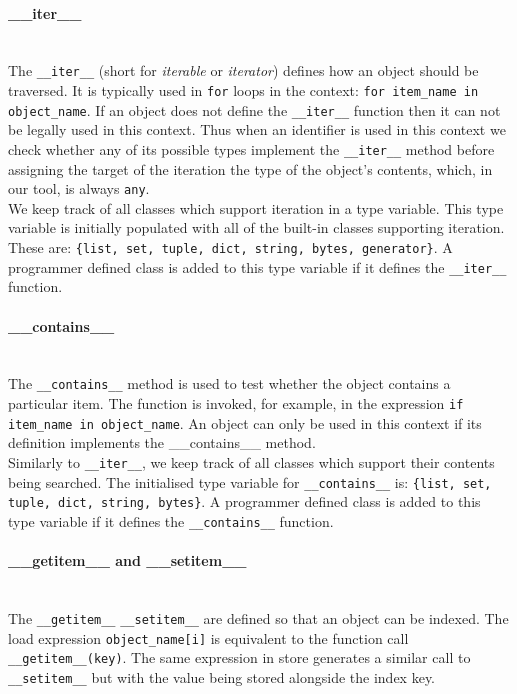 \documentclass[12pt, titlepage]{article}
\begin{document}
\paragraph*{\_\_iter\_\_}\mbox{} \\
The \texttt{\_\_iter\_\_} (short for \textit{iterable} or \textit{iterator}) defines how an object should be traversed. It is typically used in \texttt{for} loops in the context: \texttt{for item\_name in object\_name}. If an object does not define the \texttt{\_\_iter\_\_} function then it can not be legally used in this context. Thus when an identifier is used in this context we check whether any of its possible types implement the \texttt{\_\_iter\_\_} method before assigning the target of the iteration the type of the object's contents, which, in our tool, is always \texttt{any}. \\
\indent We keep track of all classes which support iteration in a type variable. This type variable is initially populated with all of the built-in classes supporting iteration. These are: \texttt{\{list, set, tuple, dict, string, bytes, generator\}}. A programmer defined class is added to this type variable if it defines the \texttt{\_\_iter\_\_} function.

\paragraph*{\_\_contains\_\_}\mbox{} \\
The \texttt{\_\_contains\_\_} method is used to test whether the object contains a particular item. The function is invoked, for example, in the expression \texttt{if item\_name in object\_name}. An object can only be used in this context if its definition implements the \_\_contains\_\_ method. \\
\indent Similarly to \texttt{\_\_iter\_\_}, we keep track of all classes which support their contents being searched. The initialised type variable for \texttt{\_\_contains\_\_} is: \texttt{\{list, set, tuple, dict, string, bytes\}}. A programmer defined class is added to this type variable if it defines the \texttt{\_\_contains\_\_} function.

\paragraph*{\_\_getitem\_\_ and \_\_setitem\_\_}\mbox{} \\
The \texttt{\_\_getitem\_\_} \texttt{\_\_setitem\_\_} are defined so that an object can be indexed. The load expression \texttt{object\_name[i]} is equivalent to the function call \texttt{\_\_getitem\_\_(key)}. The same expression in store generates a similar call to \texttt{\_\_setitem\_\_} but with the value being stored alongside the index key.
\end{document}
